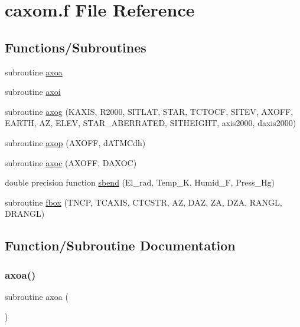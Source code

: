 \hypertarget{caxom_8f}{}\section{caxom.\+f File Reference}
\label{caxom_8f}
\subsection*{Functions/\+Subroutines}
\begin{DoxyCompactItemize}
\item 
subroutine \hyperlink{caxom_8f_a00bf77da8d950020a231942afc3f9e92}{axoa}
\item 
subroutine \hyperlink{caxom_8f_a893d9abb2fc624d31f3f79849346a6a4}{axoi}
\item 
subroutine \hyperlink{caxom_8f_ae2477acae4c628d09e3a0f61f28a62ef}{axog} (K\+A\+X\+IS, R2000, S\+I\+T\+L\+AT, S\+T\+AR, T\+C\+T\+O\+CF, S\+I\+T\+EV, A\+X\+O\+FF, E\+A\+R\+TH, AZ, E\+L\+EV, S\+T\+A\+R\+\_\+\+A\+B\+E\+R\+R\+A\+T\+ED, S\+I\+T\+H\+E\+I\+G\+HT, axis2000, daxis2000)
\item 
subroutine \hyperlink{caxom_8f_a0c171b7e33e1504b27bb7c0fb939383c}{axop} (A\+X\+O\+FF, d\+A\+T\+M\+Cdh)
\item 
subroutine \hyperlink{caxom_8f_ab35e84a52a7029ee61b540fe53998221}{axoc} (A\+X\+O\+FF, D\+A\+X\+OC)
\item 
double precision function \hyperlink{caxom_8f_ab109bff9ead327f220a0b0dc244a23d1}{sbend} (El\+\_\+rad, Temp\+\_\+K, Humid\+\_\+F, Press\+\_\+\+Hg)
\item 
subroutine \hyperlink{caxom_8f_aedf03a337fe3802d6bb5da15a890c6ef}{fbox} (T\+N\+CP, T\+C\+A\+X\+IS, C\+T\+C\+S\+TR, AZ, D\+AZ, ZA, D\+ZA, R\+A\+N\+GL, D\+R\+A\+N\+GL)
\end{DoxyCompactItemize}


\subsection{Function/\+Subroutine Documentation}
\mbox{\label{caxom_8f_a00bf77da8d950020a231942afc3f9e92}} 
\subsubsection{\texorpdfstring{axoa()}{axoa()}}
{\footnotesize\ttfamily subroutine axoa (\begin{DoxyParamCaption}{ }\end{DoxyParamCaption})}



